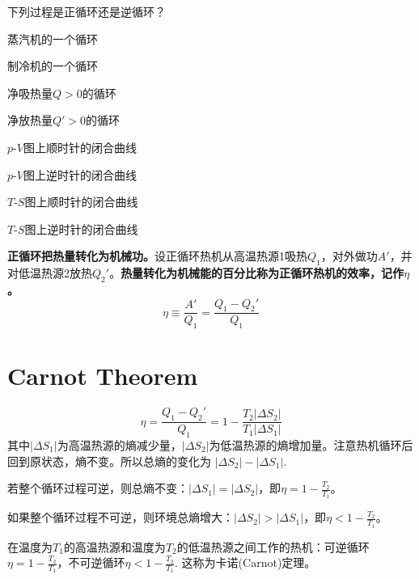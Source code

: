 \documentclass[CJK]{beamer}
\begin{document}
\begin{frame}
\bchL
下列过程是正循环还是逆循环？
\bitem
\item{蒸汽机的一个循环}
\item{制冷机的一个循环}
\item{净吸热量$Q>0$的循环}
\item{净放热量$Q'>0$的循环}
\item{$p$-$V$图上顺时针的闭合曲线}
\item{$p$-$V$图上逆时针的闭合曲线}
\item{$T$-$S$图上顺时针的闭合曲线}
\item{$T$-$S$图上逆时针的闭合曲线}
\eitem
\echL
\end{frame}


\begin{frame}
\bchL



{\bf 正循环把热量转化为机械功。}设正循环热机从高温热源1吸热$Q_1$，对外做功$A'$，并对低温热源2放热$Q_2'$。{\bf 热量转化为机械能的百分比称为正循环热机的效率，记作$\eta$。}
$$\eta \equiv \frac{A'}{Q_1}=\frac{Q_1-Q_2'}{Q_1} $$


\echL
\end{frame}

\section{Carnot Theorem}

\begin{frame}
\bch
{}
$$\eta = \frac{Q_1-Q_2'}{Q_1} = 1-\frac{T_2|\Delta S_2|}{T_1|\Delta S_1|}$$
 其中$|\Delta S_1|$为高温热源的熵减少量，$|\Delta S_2|$为低温热源的熵增加量。注意热机循环后回到原状态，熵不变。所以总熵的变化为 $|\Delta S_2| - |\Delta S_1|$.

 \bitem
 \item{若整个循环过程{\blue 可逆}，则总熵不变：$|\Delta S_1| = |\Delta S_2|$，即{\blue $ \eta = 1 - \frac{T_2}{T_1}$}。}
 \item{如果整个循环过程{\blue 不可逆}，则环境总熵增大：$|\Delta S_2| > |\Delta S_1|$，即{\blue $\eta < 1 - \frac{T_2}{T_1} $}。}
   \eitem

\ech
\end{frame}


\begin{frame}
\bchL
{}

在温度为$T_1$的高温热源和温度为$T_2$的低温热源之间工作的热机：{\blue 可逆循环$\eta = 1 -\frac{T_2}{T_1}$，不可逆循环$\eta < 1 - \frac{T_2}{T_1}$. 这称为卡诺(Carnot)定理}。
\echL
\end{frame}
\end{document}
